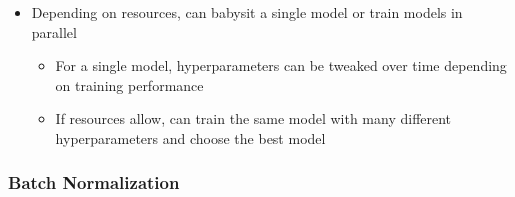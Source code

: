 \documentclass[12pt, letterpaper]{article}
\begin{document}
\begin{itemize}
\begin{itemize}
        \end{itemize}
        \item Depending on resources, can babysit a single model or train models in parallel 
        \begin{itemize}
            \item For a single model, hyperparameters can be tweaked over time depending on training performance
            \item If resources allow, can train the same model with many different hyperparameters and choose the best model
        \end{itemize}
    \end{itemize}

    \subsubsection{Batch Normalization}
\end{document}
